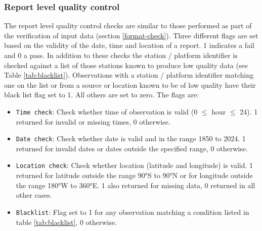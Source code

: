 \subsubsection{Report level quality control} \label{report-qc}
The report level quality control checks are similar to those performed as part of the verification of input data (section \ref{format-check}).
Three different flags are set based on the validity of the date, time and location of a report. 1 indicates a fail and 0 a pass.
In addition to these checks the station / platform identifier is checked against a list of those stations known to produce low quality data (see Table \ref{tab:blacklist}). 
Observations with a station / platform identifier matching one on the list or from a source or location known to be of low quality have their black list flag set to 1. All others are set to zero.
The flags are:
\begin{itemize}
\item \texttt{Time check}: Check whether time of observation is valid (0 $\leq$ hour $\leq$ 24). 1 returned for invalid or missing times, 0 otherwise.
\item \texttt{Date check}: Check whether date is valid and in the range 1850 to 2024. 1 returned for invalid dates or dates outside the specified range, 0 otherwise.
\item \texttt{Location check}: Check whether location (latitude and longitude) is valid. 1 returned for latitude outside the range 90°S to 90°N or for longitude outside the range 180°W to 360°E. 1 also returned for missing data, 0 returned in all other cases.
\item \texttt{Blacklist}: Flag set to 1 for any observation matching a condition listed in table \ref{tab:blacklist}, 0 otherwise.
\end{itemize}

